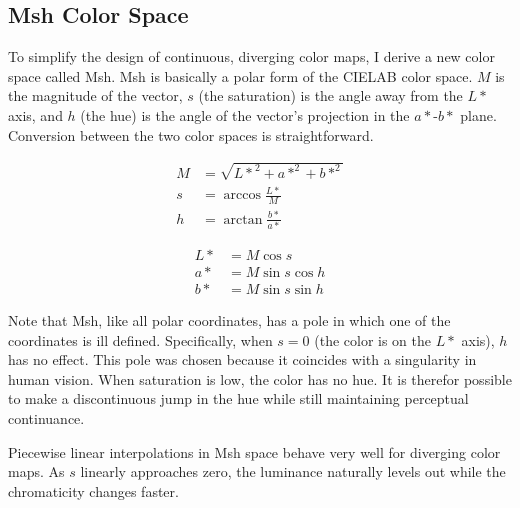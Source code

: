 \documentclass{acmsiggraph}               %
\newcommand{\Lab}{CIELAB\xspace}
\newcommand{\Msh}{Msh\xspace}
\begin{document}
\subsection{\Msh Color Space}
\label{sec:MshColorSpace}

To simplify the design of continuous, diverging color maps, I derive a new
color space called \Msh.  \Msh is basically a polar form of the \Lab color
space.  $M$ is the magnitude of the vector, $s$ (the saturation) is the
angle away from the $L*$ axis, and $h$ (the hue) is the angle of the
vector's projection in the $a*$-$b*$ plane.  Conversion between the two
color spaces is straightforward.

\begin{equation}
  \begin{split}
    M &= \sqrt{{L*}^2 + a*^2 + b*^2} \\
    s &= \arccos \frac{L*}{M} \\
    h &= \arctan \frac{b*}{a*}
  \end{split}
  \label{eqn:LabToMsh}
\end{equation}

\begin{equation}
  \begin{split}
    L* &= M \cos s \\
    a* &= M \sin s \cos h \\
    b* &= M \sin s \sin h
  \end{split}
  \label{eqn:MshToLab}
\end{equation}

Note that \Msh, like all polar coordinates, has a pole in which one of the
coordinates is ill defined.  Specifically, when $s = 0$ (the color is on
the $L*$ axis), $h$ has no effect.  This pole was chosen because it
coincides with a singularity in human vision.  When saturation is low, the
color has no hue.  It is therefor possible to make a discontinuous jump
in the hue while still maintaining perceptual continuance.

Piecewise linear interpolations in \Msh space behave very well for
diverging color maps.  As $s$ linearly approaches zero, the luminance
naturally levels out while the chromaticity changes faster.
\end{document}
